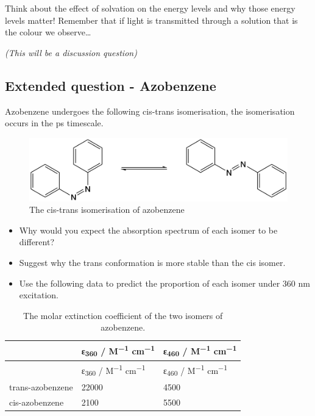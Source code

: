 \documentclass[
]{book}
\begin{document}
Think about the effect of solvation on the energy levels and why those energy levels matter! Remember that if light is transmitted through a solution that is the colour we observe\ldots{}

\emph{(This will be a discussion question)}

\hypertarget{subsec:Azobenzene}{%
\subsection{Extended question - Azobenzene}\label{subsec:Azobenzene}}

Azobenzene undergoes the following cis-trans isomerisation, the isomerisation occurs in the ps timescale.

\begin{figure}

{\centering \includegraphics[width=0.7\linewidth]{images/cistransazobenzene} 

}

\caption{The cis-trans isomerisation of azobenzene}\label{fig:cistransazobenzeneisomerisation}
\end{figure}

\begin{itemize}
\item
  Why would you expect the absorption spectrum of each isomer to be different?
\item
  Suggest why the trans conformation is more stable than the cis isomer.
\item
  Use the following data to predict the proportion of each isomer under 360 nm excitation.
\end{itemize}

\begin{longtable}[]{@{}lll@{}}
\caption{\label{tab:azobenzeneabs} The molar extinction coefficient of the two isomers of azobenzene.}\tabularnewline
\toprule
& ε\textsubscript{360} / M\textsuperscript{−1} cm\textsuperscript{−1} & ε\textsubscript{460} / M\textsuperscript{−1} cm\textsuperscript{−1} \\
\midrule
\endfirsthead
\toprule
& ε\textsubscript{360} / M\textsuperscript{−1} cm\textsuperscript{−1} & ε\textsubscript{460} / M\textsuperscript{−1} cm\textsuperscript{−1} \\
\midrule
\endhead
trans-azobenzene & 22000 & 4500 \\
cis-azobenzene & 2100 & 5500 \\
\bottomrule
\end{longtable}
\end{document}
